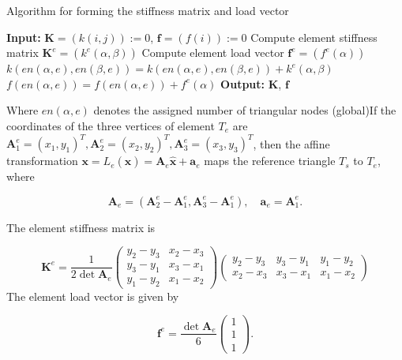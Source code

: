 \documentclass{article}
\begin{document}
\begin{algorithm}
\caption{Algorithm for forming the stiffness matrix and load vector}
\begin{algorithmic}

\State \textbf{Input:} $\boldsymbol{K} = (k(i, j)) := 0$, $\boldsymbol{f} = (f(i)) := 0$
    \State Compute element stiffness matrix $\boldsymbol{K}^{e} = \left(k^{e}(\alpha, \beta)\right)$
    \State Compute element load vector $\boldsymbol{f}^{e} = \left(f^{e}(\alpha)\right)$
        \State $k(e n(\alpha, e), e n(\beta, e)) = k(e n(\alpha, e), e n(\beta, e)) + k^{e}(\alpha, \beta)$
        \State $f(e n(\alpha, e)) = f(e n(\alpha, e)) + f^{e}(\alpha)$
    \EndFor
\EndFor
\State \textbf{Output:} $\boldsymbol{K}$, $\boldsymbol{f}$
\end{algorithmic}
\end{algorithm}

Where $en(\alpha,e)$ denotes the assigned number of triangular nodes (global)If the coordinates of the three vertices of element $T_{e}$ are $\boldsymbol{A}_{1}^{e}=\left(x_{1}, y_{1}\right)^{T}, \boldsymbol{A}_{2}^{e}=\left(x_{2}, y_{2}\right)^{T}, \boldsymbol{A}_{3}^{e}=\left(x_{3}, y_{3}\right)^{T}$, then the affine transformation $\boldsymbol{x}=L_{e}(\hat{\boldsymbol{x}})=\boldsymbol{A}_{e} \hat{\boldsymbol{x}}+\boldsymbol{a}_{e}$ maps the reference triangle $T_{s}$ to $T_{e}$, where

$$
\boldsymbol{A}_{e}=\left(\boldsymbol{A}_{2}^{e}-\boldsymbol{A}_{1}^{e}, \boldsymbol{A}_{3}^{e}-\boldsymbol{A}_{1}^{e}\right), \quad \boldsymbol{a}_{e}=\boldsymbol{A}_{1}^{e} .
$$

The element stiffness matrix is

$$
\boldsymbol{K}^{e}=\frac{1}{2 \operatorname{det} \boldsymbol{A}_{e}}\left(\begin{array}{ll}
y_{2}-y_{3} & x_{2}-x_{3} \\
y_{3}-y_{1} & x_{3}-x_{1} \\
y_{1}-y_{2} & x_{1}-x_{2}
\end{array}\right)\left(\begin{array}{ccc}
y_{2}-y_{3} & y_{3}-y_{1} & y_{1}-y_{2} \\
x_{2}-x_{3} & x_{3}-x_{1} & x_{1}-x_{2}
\end{array}\right)
$$
The element load vector is given by

$$
\boldsymbol{f}^{e}=\frac{\operatorname{det} \boldsymbol{A}_{e}}{6}\left(\begin{array}{l}
1 \\
1 \\
1
\end{array}\right).
$$
\end{document}
